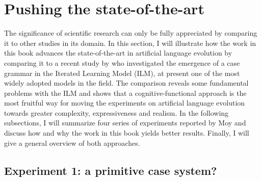 \section{Pushing the state-of-the-art}
\label{s:impact}

The significance of scientific research can only be fully appreciated by comparing it to other studies in its domain. In this section, I will illustrate how the work in this book advances the state-of-the-art in artificial language evolution by comparing it to a recent study by \citet{moy06case} who investigated the emergence of a case grammar in the Iterated Learning Model (ILM), at present one of the most widely adopted models in the field. The comparison reveals some fundamental problems with the ILM and shows that a cognitive-functional approach is the most fruitful way for moving the experiments on artificial language evolution towards greater complexity, expressiveness and realism. In the following subsections, I will summarize four series of experiments reported by Moy and discuss how and why the work in this book yields better results. Finally, I will give a general overview of both approaches.

\subsection{Experiment 1: a primitive case system?}

